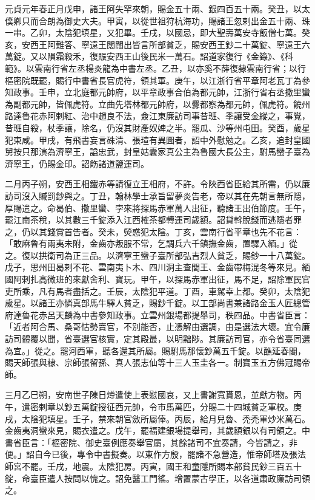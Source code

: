 \begin{pinyinscope}
 元貞元年春正月戊申，諸王阿失罕來朝，賜金五十兩、銀四百五十兩。癸丑，以太僕卿只而合朗為御史大夫。甲寅，以從世祖狩杭海功，賜諸王忽剌出金五十兩、珠一串。乙卯，太陰犯填星，又犯畢。壬戌，以國忌，即大聖壽萬安寺飯僧七萬。癸亥，安西王阿難答、寧遠王闊闊出皆言所部貧乏，賜安西王鈔二十萬錠、寧遠王六萬錠。又以隕霜殺禾，復賑安西王山後民米一萬石。詔道家復行《金籙》、《科範》。以雲南行省左丞楊炎龍為中書左丞。乙丑，以亦奚不薛復隸雲南行省；以行樞密院既罷，賜行中書省長官虎符，領其軍。庚午，以江浙行省平章阿老瓦丁為參知政事。壬申，立北庭都元帥府，以平章政事合伯為都元帥，江浙行省右丞撒里蠻為副都元帥，皆佩虎符。立曲先塔林都元帥府，以釁都察為都元帥，佩虎符。饒州路達魯花赤阿剌紅、治中趙良不法，僉江東廉訪司事昔班、季讓受金縱之，事覺，昔班自殺，杖季讓，除名，仍沒其財產奴婢之半。罷瓜、沙等州屯田。癸酉，歲星犯東咸。甲戌，有飛書妄言硃清、張瑄有異圖者，詔中外慰勉之。乙亥，追封皇國舅按只那演為濟寧王，謚忠武，封皇姑囊家真公主為魯國大長公主，駙馬蠻子臺為濟寧王，仍賜金印。詔飭諸道鹽運司。



 二月丙子朔，安西王相鐵赤等請復立王相府，不許。令陜西省臣給其所需，仍以廉訪司沒入贓罰鈔與之。丁丑，翰林學士承旨留夢炎告老，帝以其在先朝言無所隱，厚賜遣之。命曷伯、撒里蠻、孛來將探馬赤軍萬人出征，聽諸王出伯節度。壬午，罷江南茶稅，以其數三千錠添入江西榷茶都轉運司歲額。詔貸斡脫錢而逃隱者罪之，仍以其錢賞首告者。癸未，熒惑犯太陰。丁亥，雲南行省平章也先不花言：「敢麻魯有兩夷未附，金齒亦叛服不常，乞調兵六千鎮撫金齒，置驛入緬。」從之。復以拱衛司為正三品。以濟寧王蠻子臺所部弘吉烈人貧乏，賜鈔一十八萬錠。戊子，思州田曷剌不花、雲南夷卜木、四川洞主查閭王、金齒帶梅混冬等來見。緬國阿剌扎高微班的來獻舍利、寶玩。甲午，以探馬赤軍出征，馬不足，詔除軍民官吏所乘，凡有馬者盡括之。壬辰，太陰犯平道。丁酉，車駕幸上都。癸卯，太陰犯歲星。以諸王亦憐真部馬牛驛人貧乏，賜鈔千錠。以工部尚書兼諸路金玉人匠總管府達魯花赤呂天麟為中書參知政事。立雲州銀場都提舉司，秩四品。中書省臣言：「近者阿合馬、桑哥怙勢賣官，不別能否，止憑解由選調，由是選法大壞。宜令廉訪司體覆以聞，省臺選官核實，定其殿最，以明黜陟。其廉訪司官，亦令省臺同選為宜。」從之。罷河西軍，聽各還其所屬。賜駙馬那懷鈔萬五千錠。以醮延春閣，賜天師張與棣、宗師張留孫、真人張志仙等十三人玉圭各一。制寶玉五方佛冠賜帝師。



 三月乙巳朔，安南世子陳日燇遣使上表慰國哀，又上書謝寬貰恩，並獻方物。丙午，遣密剌章以鈔五萬錠授征西元帥，令市馬萬匹，分賜二十四城貧乏軍校。庚戌，太陰犯填星。壬子，禁來朝官斂所屬俸。丙辰，給月兒魯、禿禿軍炒米萬石。金齒夷洞蠻來見，賜衣遣之。戊午，罷福建銀場提舉司，其歲額銀以有司領之。中書省臣言：「樞密院、御史臺例應奏舉官屬，其餘諸司不宜奏請，今皆請之，非便。」詔自今已後，專令中書擬奏。以東作方殷，罷諸不急營造，惟帝師塔及張法師宮不罷。壬戌，地震。太陰犯房。丙寅，國王和童隱所賜本部貧民鈔三百五十錠，命臺臣遣人按問以愧之。詔免醫工門徭。增置蒙古學正，以各道肅政廉訪司領之。




\end{pinyinscope}
